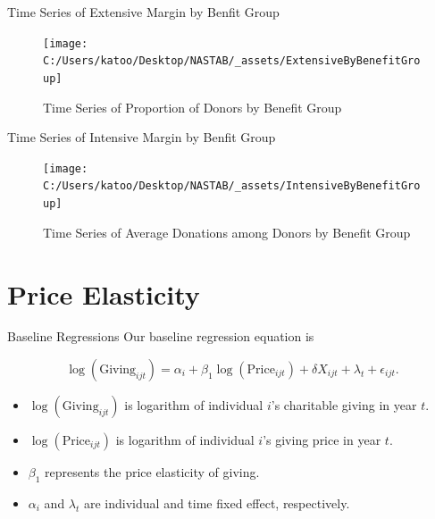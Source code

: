 \documentclass[
  ignorenonframetext,
]{beamer}
\providecommand{\tightlist}{%
  \setlength{\itemsep}{0pt}\setlength{\parskip}{0pt}}
\begin{document}
\begin{frame}{Time Series of Extensive Margin by Benfit Group}
\protect\hypertarget{time-series-of-extensive-margin-by-benfit-group}{}
\begin{figure}
\texttt{[image: C:/Users/katoo/Desktop/NASTAB/\_assets/ExtensiveByBenefitGroup]} \caption{Time Series of Proportion of Donors by Benefit Group}\label{fig:unnamed-chunk-4}
\end{figure}
\end{frame}

\begin{frame}{Time Series of Intensive Margin by Benfit Group}
\protect\hypertarget{time-series-of-intensive-margin-by-benfit-group}{}
\begin{figure}
\texttt{[image: C:/Users/katoo/Desktop/NASTAB/\_assets/IntensiveByBenefitGroup]} \caption{Time Series of Average Donations among Donors by Benefit Group}\label{fig:unnamed-chunk-5}
\end{figure}
\end{frame}

\hypertarget{price-elasticity}{%
\section{Price Elasticity}\label{price-elasticity}}

\begin{frame}{Baseline Regressions}
\protect\hypertarget{baseline-regressions}{}
Our baseline regression equation is

\[
    \log(\text{Giving}_{ijt}) = 
    \alpha_i + \beta_1 \log(\text{Price}_{ijt}) + \delta X_{ijt} + \lambda_t + \epsilon_{ijt}.
\]

\begin{itemize}
\tightlist
\item
  \(\log(\text{Giving}_{ijt})\) is logarithm of individual \(i\)'s
  charitable giving in year \(t\).
\item
  \(\log(\text{Price}_{ijt})\) is logarithm of individual \(i\)'s giving
  price in year \(t\).
\item
  \(\beta_1\) represents the price elasticity of giving.
\item
  \(\alpha_i\) and \(\lambda_t\) are individual and time fixed effect,
  respectively.
\end{itemize}
\end{frame}
\end{document}

